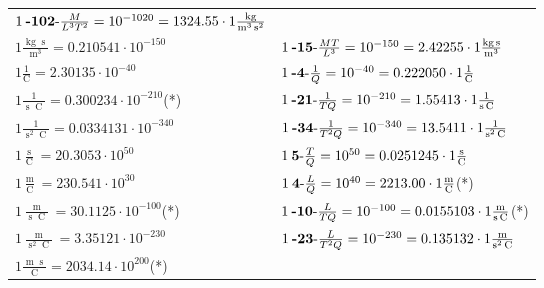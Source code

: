 \begin{center}
\begin{longtable}{l l}
	{\color{black}$1\:\text{\textbf{-102}-} \frac{M}{L^3T^2}=10^{-1020} = 1324.55 \cdot 1 \bm{\mathrm{ }}\frac{\operatorname{kg}}{\operatorname{m}^3\operatorname{s}^2}$}\\
{\color{black}$1 \bm{\mathrm{ }}\frac{\operatorname{kg}\operatorname{s}}{\operatorname{m}^3} = 0.210541\cdot10^{-150} $}&
	{\color{black}$1\:\text{\textbf{-15}-} \frac{MT}{L^3}=10^{-150} = 2.42255 \cdot 1 \bm{\mathrm{ }}\frac{\operatorname{kg}\operatorname{s}}{\operatorname{m}^3}$}\\
\hline{\color{black}$1 \bm{\mathrm{ }}\frac1{\operatorname{C}} = 2.30135\cdot10^{-40} $}&
	{\color{black}$1\:\text{\textbf{-4}-} \frac1{Q}=10^{-40} = 0.222050 \cdot 1 \bm{\mathrm{ }}\frac1{\operatorname{C}}$}\\
{\color{black}$1 \bm{\mathrm{ }}\frac1{\operatorname{s}\operatorname{C}} = 0.300234\cdot10^{-210} $}\quad(*)&
	{\color{black}$1\:\text{\textbf{-21}-} \frac1{TQ}=10^{-210} = 1.55413 \cdot 1 \bm{\mathrm{ }}\frac1{\operatorname{s}\operatorname{C}}$}\\
{\color{black}$1 \bm{\mathrm{ }}\frac1{\operatorname{s}^2\operatorname{C}} = 0.0334131\cdot10^{-340} $}&
	{\color{black}$1\:\text{\textbf{-34}-} \frac1{T^2Q}=10^{-340} = 13.5411 \cdot 1 \bm{\mathrm{ }}\frac1{\operatorname{s}^2\operatorname{C}}$}\\
{\color{black}$1 \bm{\mathrm{ }}\frac{\operatorname{s}}{\operatorname{C}} = 20.3053\cdot10^{50} $}&
	{\color{black}$1\:\text{\textbf{5}-} \frac{T}{Q}=10^{50} = 0.0251245 \cdot 1 \bm{\mathrm{ }}\frac{\operatorname{s}}{\operatorname{C}}$}\\
{\color{black}$1 \bm{\mathrm{ }}\frac{\operatorname{m}}{\operatorname{C}} = 230.541\cdot10^{30} $}&
	{\color{black}$1\:\text{\textbf{4}-} \frac{L}{Q}=10^{40} = 2213.00 \cdot 1 \bm{\mathrm{ }}\frac{\operatorname{m}}{\operatorname{C}}$}\quad(*)\\
{\color{black}$1 \bm{\mathrm{ }}\frac{\operatorname{m}}{\operatorname{s}\operatorname{C}} = 30.1125\cdot10^{-100} $}\quad(*)&
	{\color{black}$1\:\text{\textbf{-10}-} \frac{L}{TQ}=10^{-100} = 0.0155103 \cdot 1 \bm{\mathrm{ }}\frac{\operatorname{m}}{\operatorname{s}\operatorname{C}}$}\quad(*)\\
{\color{black}$1 \bm{\mathrm{ }}\frac{\operatorname{m}}{\operatorname{s}^2\operatorname{C}} = 3.35121\cdot10^{-230} $}&
	{\color{black}$1\:\text{\textbf{-23}-} \frac{L}{T^2Q}=10^{-230} = 0.135132 \cdot 1 \bm{\mathrm{ }}\frac{\operatorname{m}}{\operatorname{s}^2\operatorname{C}}$}\\
{\color{black}$1 \bm{\mathrm{ }}\frac{\operatorname{m}\operatorname{s}}{\operatorname{C}} = 2034.14\cdot10^{200} $}\quad(*)&

\end{longtable}
\end{center}
